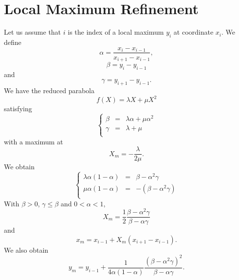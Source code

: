 \documentclass[aps,twocolumn]{revtex4}
\begin{document}
\section{Local Maximum Refinement}
Let us assume that $i$ is the index of a local maximum $y_i$ at coordinate $x_i$.
We define
\begin{equation}
	\alpha = \dfrac{x_{i}-x_{i-1}}{x_{i+1}-x_{i-1}},
\end{equation}
\begin{equation}
	\beta  = y_i - y_{i-1}
\end{equation}
and
\begin{equation}
	\gamma = y_{i+1} - y_{i-1}.
\end{equation}
We have the reduced parabola
\begin{equation}
	f(X) = \lambda X + \mu X^2
\end{equation}
satisfying
\begin{equation}
	\left\lbrace
	\begin{array}{rcl}
	\beta  & = & \lambda \alpha + \mu \alpha^2\\
	\gamma & = & \lambda+\mu\\
	\end{array}
	\right.
\end{equation}
with a maximum at
\begin{equation}
	X_m = -\dfrac{\lambda}{2\mu}.
\end{equation}
We obtain
\begin{equation}
	\left\lbrace
	\begin{array}{rcl}
	\lambda \alpha(1-\alpha) & = & \beta - \alpha^2\gamma \\
	\mu     \alpha(1-\alpha) & = & -(\beta - \alpha^2\gamma)  \\
	\end{array}
	\right.
\end{equation}
With $\beta>0$, $\gamma\leq\beta$ and $0<\alpha<1$, 
\begin{equation}
	X_m = \dfrac{1}{2} \dfrac{\beta - \alpha^2\gamma}{\beta - \alpha\gamma}
\end{equation}
and
\begin{equation}
	x_m = x_{i-1} + X_m \left(x_{i+1}-x_{i-1}\right).
\end{equation}
We also obtain
\begin{equation}
	y_m = y_{i-1} + \dfrac{1}{4\alpha\left(1-\alpha\right)} \dfrac{\left(\beta - \alpha^2\gamma\right)^2}{\beta-\alpha\gamma}.
\end{equation}
\end{document}
